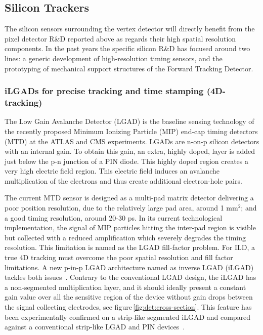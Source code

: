 \subsection{Silicon Trackers}

The silicon sensors surrounding the vertex detector will directly benefit from the pixel detector R\&D reported above as regards their high spatial resolution components. In the past years the specific silicon R\&D has focused around two lines: a generic development of high-resolution timing sensors, and the prototyping of mechanical support structures of the Forward Tracking Detector.

\subsubsection{iLGADs for precise tracking and time stamping (4D-tracking)}

The Low Gain Avalanche Detector (LGAD) is the baseline sensing technology of the recently proposed Minimum Ionizing Particle (MIP) end-cap timing detectors (MTD) at the ATLAS and CMS experiments. LGADs are n-on-p silicon detectors with an internal gain. To obtain this gain, an extra, highly doped, layer is added just below the p-n junction of a PIN diode. This highly doped region creates a very high electric field region. This electric field induces an avalanche multiplication of the electrons and thus create additional electron-hole pairs\cite{PELLEGRINI201412}. 

The current MTD sensor is designed as a multi-pad matrix detector delivering a poor position resolution, due to the relatively large pad area, around 1 mm$^2$; and a good timing resolution, around 20-30 ps. In its current technological implementation, the signal of MIP particles hitting the inter-pad region is visible but collected with a reduced amplification which severely degrades the timing resolution. This limitation is named as the LGAD fill-factor problem. For ILD, a true 4D tracking  must overcome the poor spatial resolution and fill factor limitations. A new p-in-p LGAD architecture named as inverse LGAD (iLGAD) tackles both issues~\cite{Carulla_2016}. Contrary to the conventional LGAD design, the iLGAD has a non-segmented multiplication layer, and it should ideally present a constant gain value over all the sensitive region of the device without gain drops between the signal collecting electrodes, see figure\,\ref{fig:det:cross-section}. This feature has been experimentally confirmed on a strip-like segmented iLGAD and compared against a conventional strip-like LGAD and PIN devices~\cite{Curras2019}. 

